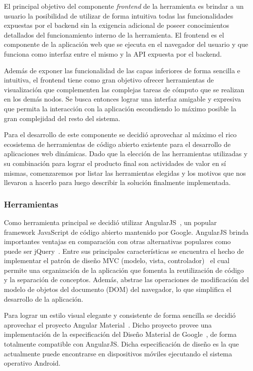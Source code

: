 El principal objetivo del componente \textit{frontend} de la herramienta es brindar a un usuario la
posibilidad de utilizar de forma intuitiva todas las funcionalidades expuestas por el backend sin la
exigencia adicional de poseer conocimientos detallados del funcionamiento interno de la herramienta.
El frontend es el componente de la aplicación web que se ejecuta en el navegador del usuario y que
funciona como interfaz entre el mismo y la API expuesta por el backend.

Además de exponer las funcionalidad de las capas inferiores de forma sencilla e intuitiva, el frontend
tiene como gran objetivo ofrecer herramientas de visualización que complementen las complejas tareas de
cómputo que se realizan en los demás nodos. Se busca entonces lograr una interfaz amigable y expresiva
que permita la interacción con la aplicación escondiendo lo máximo posible la gran complejidad del resto
del sistema.

Para el desarrollo de este componente se decidió aprovechar al máximo el rico ecosistema de herramientas
de código abierto existente para el desarrollo de aplicaciones web dinámicas. Dado que la elección de las
herramientas utilizadas y su combinación para lograr el producto final son actividades de valor en sí
mismas, comenzaremos por listar las herramientas elegidas y los motivos que nos llevaron a hacerlo para
luego describir la solución finalmente implementada.

\subsubsection{Herramientas}

Como herramienta principal se decidió utilizar AngularJS~\cite{AngularJS}, un popular framework JavaScript
de código abierto mantenido por Google. AngularJS brinda importantes ventajas en comparación con otras
alternativas populares como puede ser jQuery~\cite{jQuery}. Entre sus principales características se
encuentra el hecho de implementar el patrón de diseño MVC (modelo, vista, controlador)~\cite{Leff2001} el
cual permite una organización de la aplicación que fomenta la reutilización de código y la separación de
conceptos. Además, abstrae las operaciones de modificación del modelo de objetos del documento (DOM) del
navegador, lo que simplifica el desarrollo de la aplicación.

Para lograr un estilo visual elegante y consistente de forma sencilla se decidió aprovechar el proyecto
Angular Material~\cite{AngularMaterial}. Dicho proyecto provee una implementación de la especificación del
Diseño Material de Google~\cite{MaterialDesign}, de forma totalmente compatible con AngularJS. Dicha
especificación de diseño es la que actualmente puede encontrarse en dispositivos móviles ejecutando el
sistema operativo Android.

